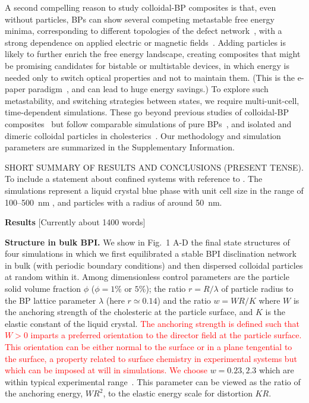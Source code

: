 \documentclass[12pt]{article}
\begin{document}
A second compelling reason to study colloidal-BP composites is that, even without particles, BPs can show several competing metastable free energy minima,
corresponding to different topologies of the defect network~\cite{adriano,fukuda}, with a strong dependence on applied electric or magnetic fields~\cite{henrichfield}.
% 
Adding particles is likely to further enrich the free energy landscape, creating composites that might be promising candidates for bistable or multistable devices, in which energy is needed only to switch optical properties and not to maintain them. (This is the e-paper paradigm~\cite{epaper}, and can lead to huge energy savings.)
To explore such metastability, and switching strategies between states, we require multi-unit-cell, time-dependent simulations. These go beyond previous studies of colloidal-BP composites~\cite{miha} but follow comparable simulations of pure BPs~\cite{bp3,henrichfield,domaingrowth}, and isolated and dimeric colloidal particles in cholesterics~\cite{juho1,juho2}. Our methodology and simulation parameters are summarized in the Supplementary Information.

SHORT SUMMARY OF RESULTS AND CONCLUSIONS (PRESENT TENSE). To include a
statement about confined systems with reference to \cite{extrareference2}.
The simulations represent a liquid crystal
blue phase with unit cell size in the range of 100--500~nm \cite{mermin},
and particles with a radius of around 50~nm.

\bigskip
\noindent
\textbf{\large Results} [Currently about 1400 words]

\noindent
\textbf{Structure in bulk BPI.}
We show in Fig.~1 A-D the final state structures of four simulations in which we first equilibrated a stable BPI disclination network in bulk (with periodic boundary conditions) and then dispersed colloidal particles at random within it. Among dimensionless control parameters are the particle solid volume fraction $\phi$  ($\phi = 1\%$ or $5\%$); the ratio $r = R/\lambda$ of particle radius to the BP lattice parameter $\lambda$ (here $r\simeq 0.14$) and the ratio $w = WR/K$ where $W$ is the anchoring strength of the cholesteric at the particle surface, and $K$ is the elastic constant of the liquid crystal.
\textcolor{red}{
The anchoring strength is defined such that $W > 0$ imparts a preferred
orientation to the director field at the particle surface. This orientation
can be either normal to the surface or in a plane tengential to the surface,
a property related to surface chemistry in experimental systems but which
can be imposed at will in simulations.
We choose} $w = 0.23, 2.3$ which are within typical experimental range~\cite{tiffany}. This parameter can be viewed as the ratio of the anchoring energy, $WR^2$, to the elastic energy scale for distortion $KR$. 
\end{document}
